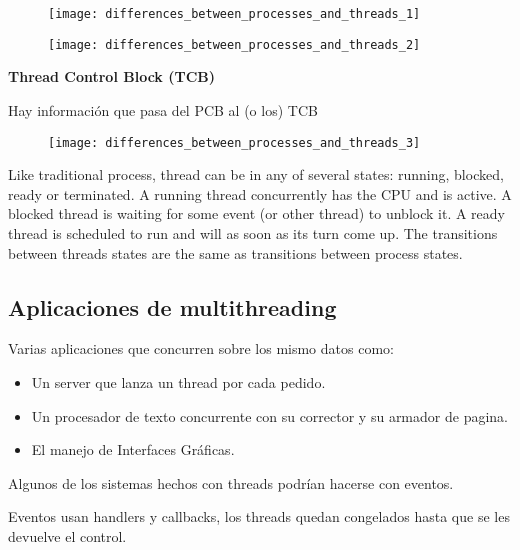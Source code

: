\documentclass[a4paper, twoside]{article}
\begin{document}
\begin{figure}[h]
	\centering
	\texttt{[image: differences\_between\_processes\_and\_threads\_1]}
	\label{fig:differences_between_processes_and_threads_1}
\end{figure}

\begin{figure}[h]
	\centering
	\texttt{[image: differences\_between\_processes\_and\_threads\_2]}
	\label{fig:differences_between_processes_and_threads_2}
\end{figure}

\textbf{Thread Control Block (TCB)}

Hay información que pasa del PCB al (o los) TCB

\begin{figure}[h]
	\centering
	\texttt{[image: differences\_between\_processes\_and\_threads\_3]}
	\label{fig:differences_between_processes_and_threads_3}
\end{figure}

Like traditional process, thread can be in any of several states: running, blocked, ready or terminated. A running thread concurrently has the CPU and is active. A blocked thread is waiting for some event (or other thread) to unblock it. A ready thread is scheduled to run and will as soon as its turn come up. The transitions between threads states are the same as transitions between process states.

\subsection{Aplicaciones de multithreading}
Varias aplicaciones que concurren sobre los mismo datos como:
\begin{itemize}
	\item Un server que lanza un thread por cada pedido.
	\item Un procesador de texto concurrente con su corrector y su armador de pagina.
	\item El manejo de Interfaces Gráficas.
\end{itemize}

Algunos de los sistemas hechos con threads podrían hacerse con eventos.

Eventos usan handlers y callbacks, los threads quedan congelados hasta que se les devuelve el control.
\end{document}
